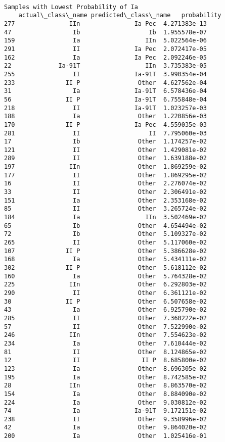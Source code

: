 \documentclass[11pt]{article}
\begin{document}
    \begin{Verbatim}[commandchars=\\\{\}]

Samples with Lowest Probability of Ia
    actual\_class\_name predicted\_class\_name   probability
277               IIn               Ia Pec  4.271383e-13
47                 Ib                   Ib  1.955578e-07
159                Ia                  IIn  5.022564e-06
291                II               Ia Pec  2.072417e-05
162                Ia               Ia Pec  2.092246e-05
22             Ia-91T                  IIn  3.735383e-05
255                II               Ia-91T  3.990354e-04
233              II P                Other  4.627562e-04
31                 Ia               Ia-91T  6.578436e-04
56               II P               Ia-91T  6.755848e-04
218                II               Ia-91T  1.023257e-03
188                Ia                Other  1.220856e-03
170              II P               Ia Pec  4.559035e-03
281                II                   II  7.795060e-03
17                 Ib                Other  1.174257e-02
121                II                Other  1.429081e-02
289                II                Other  1.639188e-02
197               IIn                Other  1.869259e-02
177                II                Other  1.869295e-02
16                 II                Other  2.276074e-02
33                 II                Other  2.306491e-02
151                Ia                Other  2.353168e-02
85                 II                Other  3.265724e-02
184                Ia                  IIn  3.502469e-02
65                 Ib                Other  4.654494e-02
72                 Ib                Other  5.109327e-02
265                II                Other  5.117060e-02
107              II P                Other  5.386628e-02
168                Ia                Other  5.434111e-02
302              II P                Other  5.618112e-02
160                Ia                Other  5.764328e-02
225               IIn                Other  6.292803e-02
290                II                Other  6.361121e-02
30               II P                Other  6.507658e-02
43                 Ia                Other  6.925790e-02
285                II                Other  7.360222e-02
57                 II                Other  7.522990e-02
246               IIn                Other  7.554623e-02
234                Ia                Other  7.610444e-02
81                 II                Other  8.124865e-02
12                 II                 II P  8.685800e-02
123                Ia                Other  8.696305e-02
195                Ia                Other  8.742585e-02
28                IIn                Other  8.863570e-02
154                Ia                Other  8.884090e-02
224                Ia                Other  9.030812e-02
74                 Ia               Ia-91T  9.172151e-02
238                II                Other  9.358996e-02
42                 Ia                Other  9.864020e-02
200                Ia                Other  1.025416e-01

    \end{Verbatim}
\end{document}
